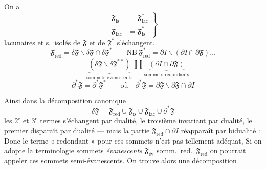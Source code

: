 \documentclass[11pt,a4paper]{article}
\begin{document}
On a
\[
  \left.
  \begin{aligned}
    \mathfrak{F}_{\mathrm{is}} &= \mathfrak{F}^{*}_{\mathrm{lac}} \\
    \mathfrak{F}_{\mathrm{lac}} &= \mathfrak{F}^{*}_{\mathrm{is}}
  \end{aligned}
  \right\}
\]
 lacunaires et s.\ isolés de $\mathfrak{F}$ et de $\mathfrak{F}^{*}$ s'échangent.
\[
  \mathfrak{F}_{\mathrm{red}} = \delta\mathfrak{F} \smallsetminus \delta\mathfrak{F} \cap \delta\mathfrak{F}^{*}
  \qquad \text{NB}\ \mathfrak{F}^{*}_{\mathrm{red}} = \partial I \smallsetminus (\partial I \cap \partial\mathfrak{F}) \ldots
\]
\[
  = \underbrace{(\delta\mathfrak{F} \smallsetminus \delta\mathfrak{F}^{**})}_{\text{sommets évanescents}}
  \amalg \underbrace{(\partial I \cap \partial\mathfrak{F})}_{\text{sommets redondants}}
\]
\[
  \partial^{*}\mathfrak{F} = \partial^{*}\mathfrak{F}^{*} \qquad \text{où} \quad
  \partial^{*}\mathfrak{F} = \partial\mathfrak{F} \smallsetminus \partial\mathfrak{F} \cap \partial I
\]

Ainsi dans la décomposition canonique
\[
  \delta\mathfrak{F} = \mathfrak{F}_{\mathrm{red}} \cup \mathfrak{F}_{\mathrm{is}} \cup \mathfrak{F}_{\mathrm{lac}} \cup \partial^{*}\mathfrak{F}
\]
les $2^{\mathrm{e}}$ et $3^{\mathrm{e}}$ termes s'échangent par dualité, le troisième  invariant par dualité, le premier disparaît par dualité --- mais \struck{\ill{}} la partie  $\mathfrak{F}_{\mathrm{red}} \cap \partial I$ \struck{\ill{}} réapparaît par bidualité :  Donc le terme « redondant » pour ces sommets n'est pas tellement adéquat, \struck{\ill{}}  Si on adopte la terminologie sommets \emph{évanescents} $\mathfrak{F}_{\mathrm{év}}$  somm.\ red.\ $\mathfrak{F}_{\mathrm{red}}$ on pourrait appeler ces sommets semi-évanescents. On trouve alors une décomposition

\end{document}
